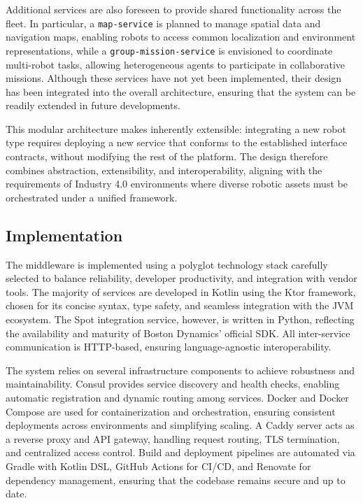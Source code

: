 \documentclass[conference]{IEEEtran}
\begin{document}
Additional services are also foreseen to provide shared functionality across the fleet. 
%
In particular, a \texttt{map-service} is planned to manage spatial data and navigation maps, 
 enabling robots to access common localization and environment representations, 
 while a \texttt{group-mission-service} is envisioned to coordinate multi-robot tasks, 
 allowing heterogeneous agents to participate in collaborative missions. 
% 
Although these services have not yet been implemented, 
 their design has been integrated into the overall architecture, 
 ensuring that the system can be readily extended in future developments.

This modular architecture makes \approach{} inherently extensible: 
 integrating a new robot type requires deploying a new service that conforms to the established interface contracts, 
 without modifying the rest of the platform. 
% 
The design therefore combines abstraction, extensibility, and interoperability, 
 aligning with the requirements of Industry 4.0 environments where diverse robotic assets 
 must be orchestrated under a unified framework.

\subsection{Implementation}
The middleware is implemented using a polyglot technology stack carefully selected to 
 balance reliability, developer productivity, and integration with vendor tools. 
% 
The majority of services are developed in Kotlin using the Ktor framework, 
 chosen for its concise syntax, type safety, and seamless integration with the JVM ecosystem. 
% 
The Spot integration service, however, is written in Python, reflecting the availability 
 and maturity of Boston Dynamics' official SDK. 
% 
All inter-service communication is HTTP-based, ensuring language-agnostic interoperability.

The system relies on several infrastructure components to achieve robustness and maintainability. 
%
Consul provides service discovery and health checks, 
 enabling automatic registration and dynamic routing among services. 
% 
Docker and Docker Compose are used for containerization and orchestration, 
 ensuring consistent deployments across environments and simplifying scaling. 
% 
A Caddy server acts as a reverse proxy and API gateway, 
 handling request routing, TLS termination, and centralized access control. 
% 
Build and deployment pipelines are automated via Gradle with Kotlin DSL, GitHub Actions for CI/CD, 
 and Renovate for dependency management, ensuring that the codebase remains secure and up to date.
\end{document}
